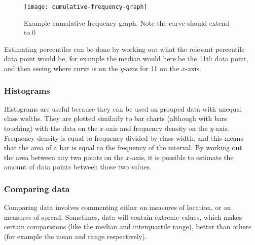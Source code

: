 \begin{figure}[ht]
	\texttt{[image: cumulative-frequency-graph]}
	\centering
	\caption{Example cumulative frequency graph. Note the curve should extend to 0}
\end{figure}

Estimating percentiles can be done by working out what the relevant percentile data point would be, for example the median would here be the 11th data point, and then seeing where curve is on the $y$-axis for 11 on the $x$-axis.

\subsubsection{Histograms}
Histograms are useful because they can be used on grouped data with unequal class widths. They are plotted similarly to bar charts (although with bars touching) with the data on the $x$-axis and frequency density on the $y$-axis. Frequency density is equal to frequency divided by class width, and this means that the area of a bar is equal to the frequency of the interval. By working out the area between any two points on the $x$-axis, it is possible to estimate the amount of data points between those two values.

\subsubsection{Comparing data}
Comparing data involves commenting either on measures of location, or on measures of spread. Sometimes, data will contain extreme values, which makes certain comparisions (like the median and interquartile range), better than others (for example the mean and range respectively).
